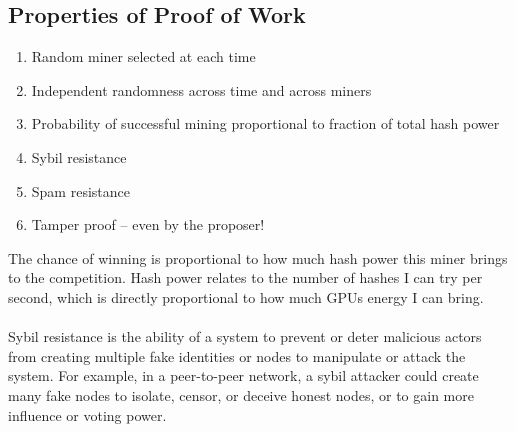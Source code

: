 \documentclass{report}
\begin{document}
\subsection*{Properties of Proof of Work}
\begin{enumerate}
	\item Random miner selected at each time
	\item Independent randomness across time and across miners
	\item Probability of successful mining proportional to fraction of total hash power
	\item Sybil resistance
	\item Spam resistance
	\item Tamper proof – even by the proposer!
\end{enumerate}
The chance of winning is proportional to how much hash power this miner brings to the competition. Hash power relates to the number of hashes I can try per second, which is directly proportional to how much GPUs energy I can bring.\\\\
Sybil resistance is the ability of a system to prevent or deter malicious actors from creating multiple fake identities or nodes to manipulate or attack the system. For example, in a peer-to-peer network, a sybil attacker could create many fake nodes to isolate, censor, or deceive honest nodes, or to gain more influence or voting power.
\end{document}
